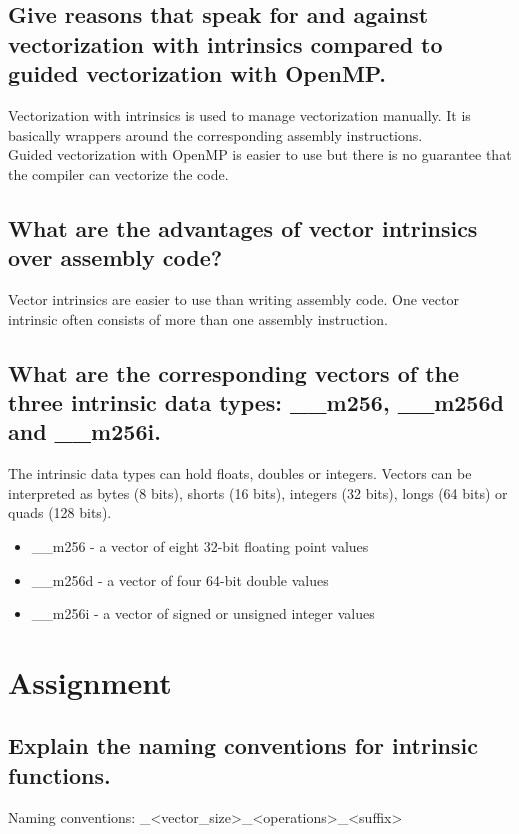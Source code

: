 \documentclass[runningheads]{llncs}
\begin{document}
\subsection{Give reasons that speak for and against vectorization with intrinsics compared to guided vectorization with OpenMP.}
Vectorization with intrinsics is used to manage vectorization manually. 
It is basically wrappers around the corresponding assembly instructions.
\\
Guided vectorization with OpenMP is easier to use but there is no guarantee that the compiler can vectorize the code.

\subsection{What are the advantages of vector intrinsics over assembly code?}
Vector intrinsics are easier to use than writing assembly code. One vector intrinsic often consists of more than one
assembly instruction. 

\subsection{What are the corresponding vectors of the three intrinsic data types: \_\_m256, \_\_m256d and \_\_m256i.}
The intrinsic data types can hold floats, doubles or integers. Vectors can be interpreted as bytes (8 bits), shorts (16 bits), 
integers (32 bits), longs (64 bits) or quads (128 bits).

\begin{itemize}
	\item \_\_m256 - a vector of eight 32-bit floating point values 
	\item \_\_m256d - a vector of four 64-bit double values
	\item \_\_m256i - a vector of signed or unsigned integer values
\end{itemize}


\section{Assignment}

\subsection{Explain the naming conventions for intrinsic functions.}

Naming conventions: \_<vector\_size>\_<operations>\_<suffix>
\end{document}
